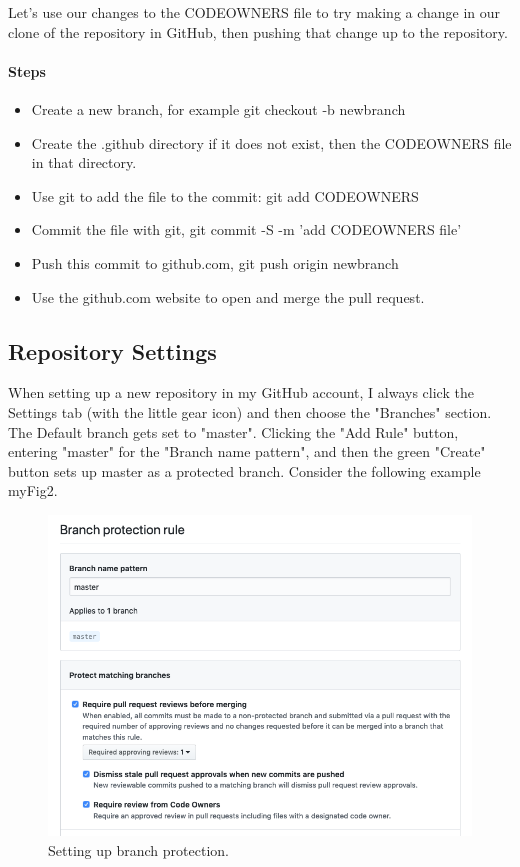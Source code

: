 \justify
Let's use our changes to the CODEOWNERS file to try making a change in
our clone of the repository in GitHub, then pushing that change up to
the repository.

\hypertarget{steps-4}{%
      \paragraph{Steps}\label{steps-4}}

\begin{itemize}

      \item
            Create a new branch, for example git checkout -b newbranch
      \item
            Create the .github directory if it does not exist, then the CODEOWNERS
            file in that directory.
      \item
            Use git to add the file to the commit: git add CODEOWNERS
      \item
            Commit the file with git, git commit -S -m 'add CODEOWNERS file'
      \item
            Push this commit to github.com, git push origin newbranch
      \item
            Use the github.com website to open and merge the pull request.
\end{itemize}


\subsection{Repository Settings}

\justify
When setting up a new repository in my GitHub account, I always click
the Settings tab (with the little gear icon) and then choose the
"Branches" section. The Default branch gets set to "master". Clicking
the "Add Rule" button, entering "master" for the "Branch name pattern",
and then the green "Create" button sets up master as a protected branch.
Consider the following example {myFig2}.

\begin{figure}
      \includegraphics[scale=0.50]{../images/github-branch-protection.png}
      \caption{Setting up branch protection.}
\end{figure}

